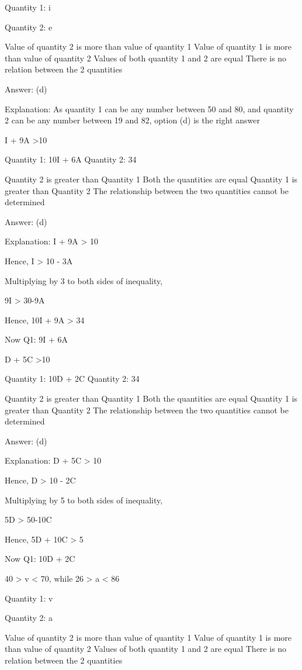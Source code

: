     Quantity 1: i

    Quantity 2: e

        Value of quantity 2 is more than value of quantity 1
        Value of quantity 1 is more than value of quantity 2
        Values of both quantity 1 and 2 are equal
        There is no relation between the 2 quantities

    Answer: (d)

    Explanation: As quantity 1 can be any number between 50 and 80, and quantity 2 can be any number between 19 and 82, option (d) is the right answer

    I + 9A >10

    Quantity 1: 10I + 6A
    Quantity 2: 34

        Quantity 2 is greater than Quantity 1
        Both the quantities are equal
        Quantity 1 is greater than Quantity 2
        The relationship between the two quantities cannot be determined

    Answer: (d)

    Explanation:  I + 9A > 10

    Hence, I > 10 - 3A

    Multiplying by 3 to both sides of inequality,

    9I > 30-9A

    Hence, 10I + 9A > 34

    Now Q1: 9I + 6A 



    D + 5C >10

    Quantity 1: 10D + 2C Quantity 2: 34

        Quantity 2 is greater than Quantity 1
        Both the quantities are equal
        Quantity 1 is greater than Quantity 2
        The relationship between the two quantities cannot be determined

    Answer: (d)

    Explanation:  D + 5C > 10

    Hence, D > 10 - 2C

    Multiplying by 5 to both sides of inequality,

    5D > 50-10C

    Hence, 5D + 10C > 5

    Now Q1: 10D + 2C

    40 > v < 70, while 26 > a < 86

    Quantity 1: v

    Quantity 2: a

        Value of quantity 2 is more than value of quantity 1
        Value of quantity 1 is more than value of quantity 2
        Values of both quantity 1 and 2 are equal
        There is no relation between the 2 quantities

